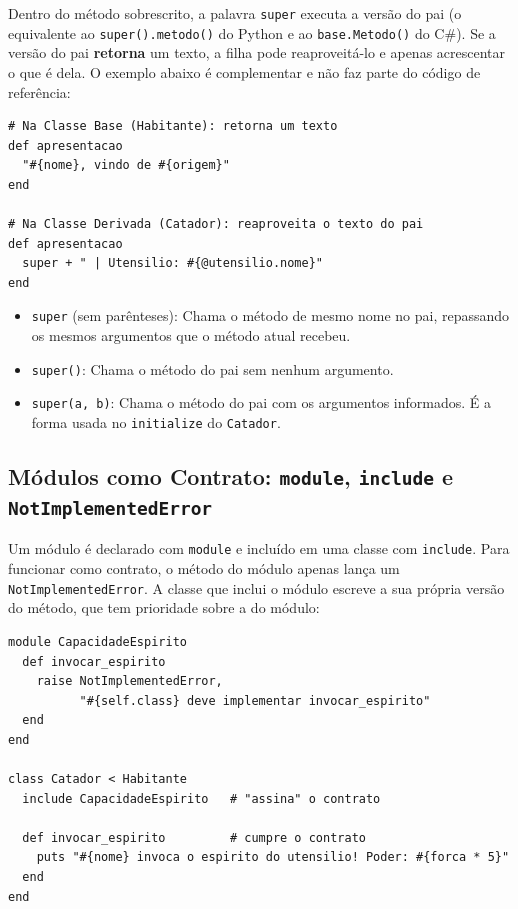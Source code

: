 Dentro do método sobrescrito, a palavra \texttt{super} executa a versão do pai (o equivalente ao
\texttt{super().metodo()} do Python e ao \texttt{base.Metodo()} do C\#). Se a versão do pai
\textbf{retorna} um texto, a filha pode reaproveitá-lo e apenas acrescentar o que é dela. O
exemplo abaixo é complementar e não faz parte do código de referência:

\begin{lstlisting}[style=ruby]
# Na Classe Base (Habitante): retorna um texto
def apresentacao
  "#{nome}, vindo de #{origem}"
end

# Na Classe Derivada (Catador): reaproveita o texto do pai
def apresentacao
  super + " | Utensilio: #{@utensilio.nome}"
end
\end{lstlisting}

\begin{itemize}
    \item \texttt{super} (sem parênteses): Chama o método de mesmo nome no pai, repassando os
    mesmos argumentos que o método atual recebeu.

    \item \texttt{super()}: Chama o método do pai sem nenhum argumento.

    \item \texttt{super(a, b)}: Chama o método do pai com os argumentos informados. É a forma
    usada no \texttt{initialize} do \texttt{Catador}.
\end{itemize}

\subsection{Módulos como Contrato: \texttt{module}, \texttt{include} e
\texttt{NotImplementedError}}

Um módulo é declarado com \texttt{module} e incluído em uma classe com \texttt{include}. Para
funcionar como contrato, o método do módulo apenas lança um \texttt{NotImplementedError}. A
classe que inclui o módulo escreve a sua própria versão do método, que tem prioridade sobre a do
módulo:

\begin{lstlisting}[style=ruby]
module CapacidadeEspirito
  def invocar_espirito
    raise NotImplementedError,
          "#{self.class} deve implementar invocar_espirito"
  end
end

class Catador < Habitante
  include CapacidadeEspirito   # "assina" o contrato

  def invocar_espirito         # cumpre o contrato
    puts "#{nome} invoca o espirito do utensilio! Poder: #{forca * 5}"
  end
end
\end{lstlisting}

